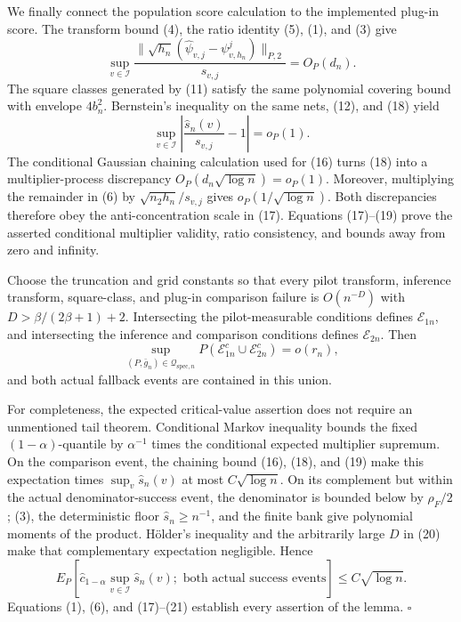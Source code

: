 We finally connect the population score calculation to the implemented plug-in score. The transform bound (4), the ratio identity (5), (1), and (3) give
\[
 \sup_{v\in\mathcal I}
 \frac{\|\sqrt{h_n}(\widehat\psi_{v,j}-\psi^j_{v,h_n})\|_{P,2}}{s_{v,j}}
 =O_P(d_n). \tag{18}
\]
The square classes generated by (11) satisfy the same polynomial covering bound with envelope \(4b_n^2\). Bernstein's inequality on the same nets, (12), and (18) yield
\[
 \sup_{v\in\mathcal I}\left|\frac{\widehat s_n(v)}{s_{v,j}}-1\right|=o_P(1). \tag{19}
\]
The conditional Gaussian chaining calculation used for (16) turns (18) into a multiplier-process discrepancy \(O_P(d_n\sqrt{\log n})=o_P(1)\). Moreover, multiplying the remainder in (6) by \(\sqrt{n_2h_n}/s_{v,j}\) gives \(o_P(1/\sqrt{\log n})\). Both discrepancies therefore obey the anti-concentration scale in (17). Equations (17)--(19) prove the asserted conditional multiplier validity, ratio consistency, and bounds away from zero and infinity.

Choose the truncation and grid constants so that every pilot transform, inference transform, square-class, and plug-in comparison failure is \(O(n^{-D})\) with \(D>\beta/(2\beta+1)+2\). Intersecting the pilot-measurable conditions defines \(\mathcal E_{1n}\), and intersecting the inference and comparison conditions defines \(\mathcal E_{2n}\). Then
\[
 \sup_{(P,\bar g_n)\in\mathcal Q_{\mathrm{spec},n}}
 P(\mathcal E_{1n}^c\cup\mathcal E_{2n}^c)=o(r_n), \tag{20}
\]
and both actual fallback events are contained in this union.

For completeness, the expected critical-value assertion does not require an unmentioned tail theorem. Conditional Markov inequality bounds the fixed \((1-\alpha)\)-quantile by \(\alpha^{-1}\) times the conditional expected multiplier supremum. On the comparison event, the chaining bound (16), (18), and (19) make this expectation times \(\sup_v\widehat s_n(v)\) at most \(C\sqrt{\log n}\). On its complement but within the actual denominator-success event, the denominator is bounded below by \(\rho_F/2\); (3), the deterministic floor \(\widehat s_n\ge n^{-1}\), and the finite bank give polynomial moments of the product. H\"older's inequality and the arbitrarily large \(D\) in (20) make that complementary expectation negligible. Hence
\[
 E_P\!\left[\widehat c_{1-\alpha}\sup_{v\in\mathcal I}\widehat s_n(v);
 \text{ both actual success events}\right]\le C\sqrt{\log n}. \tag{21}
\]
Equations (1), (6), and (17)--(21) establish every assertion of the lemma. \(\square\)